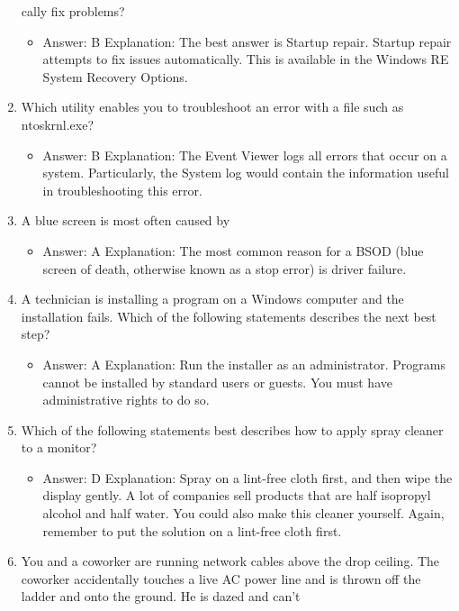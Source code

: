 \documentclass{article}
\begin{document}
\begin{enumerate}
cally fix problems?
     \begin{itemize}
         \item Answer: B
Explanation: The best answer is Startup repair. Startup repair attempts to fix issues
automatically. This is available in the Windows RE System Recovery Options.
     \end{itemize}
     \item Which utility enables you to troubleshoot an error with a file such
as ntoskrnl.exe?
     \begin{itemize}
         \item Answer: B
Explanation: The Event Viewer logs all errors that occur on a system. Particularly, the
System log would contain the information useful in troubleshooting this error.
     \end{itemize}
     \item A blue screen is most often caused by
     \begin{itemize}
         \item Answer: A
Explanation: The most common reason for a BSOD (blue screen of death, otherwise
known as a stop error) is driver failure.
     \end{itemize}
     \item A technician is installing a program on a Windows computer
and the installation fails. Which of the following statements
describes the next best step?
     \begin{itemize}
         \item Answer: A
Explanation: Run the installer as an administrator. Programs cannot be installed by
standard users or guests. You must have administrative rights to do so.
     \end{itemize}
     \item Which of the following statements best describes how to apply
spray cleaner to a monitor?
     \begin{itemize}
         \item Answer: D
Explanation: Spray on a lint-free cloth first, and then wipe the display gently. A lot of
companies sell products that are half isopropyl alcohol and half water. You could also
make this cleaner yourself. Again, remember to put the solution on a lint-free cloth
first.
     \end{itemize}
      \item You and a coworker are running network cables above the drop
ceiling. The coworker accidentally touches a live AC power line and
is thrown off the ladder and onto the ground. He is dazed and can’t

\end{enumerate}
\end{document}
